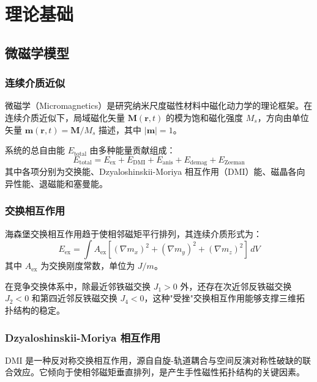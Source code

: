 \chapter{理论基础}

\section{微磁学模型}

\subsection{连续介质近似}

微磁学（Micromagnetics）是研究纳米尺度磁性材料中磁化动力学的理论框架。在连续介质近似下，局域磁化矢量 $\mathbf{M}(\mathbf{r}, t)$ 的模为饱和磁化强度 $M_s$，方向由单位矢量 $\mathbf{m}(\mathbf{r}, t) = \mathbf{M}/M_s$ 描述，其中 $|\mathbf{m}| = 1$。

系统的总自由能 $E_{\text{total}}$ 由多种能量贡献组成：
\begin{equation}
  E_{\text{total}} = E_{\text{ex}} + E_{\text{DMI}} + E_{\text{anis}} + E_{\text{demag}} + E_{\text{Zeeman}}
  \label{eq:total-energy}
\end{equation}
其中各项分别为交换能、Dzyaloshinskii-Moriya 相互作用（DMI）能、磁晶各向异性能、退磁能和塞曼能。

\subsection{交换相互作用}

海森堡交换相互作用趋于使相邻磁矩平行排列，其连续介质形式为：
\begin{equation}
  E_{\text{ex}} = \int A_{\text{ex}} \left[ (\nabla m_x)^2 + (\nabla m_y)^2 + (\nabla m_z)^2 \right] \, dV
  \label{eq:exchange}
\end{equation}
其中 $A_{\text{ex}}$ 为交换刚度常数，单位为 $\si{J/m}$。

在竞争交换体系中，除最近邻铁磁交换 $J_1 > 0$ 外，还存在次近邻反铁磁交换 $J_2 < 0$ 和第四近邻反铁磁交换 $J_4 < 0$，这种"受挫"交换相互作用能够支撑三维拓扑结构的稳定\cite{sallermann2023stability}。

\subsection{Dzyaloshinskii-Moriya 相互作用}

DMI 是一种反对称交换相互作用，源自自旋-轨道耦合与空间反演对称性破缺的联合效应。它倾向于使相邻磁矩垂直排列，是产生手性磁性拓扑结构的关键因素。

